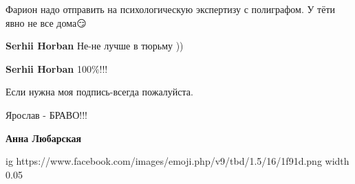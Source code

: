 \begin{itemize}
Фарион надо отправить на психологическую экспертизу с полиграфом. У тёти явно
не все дома😏

\begin{itemize}
 
\textbf{Serhii Horban} Не-не лучше в тюрьму ))

 
\textbf{Serhii Horban} 100\%!!!
\end{itemize}

 
Если нужна моя подпись-всегда пожалуйста.

 
Ярослав - БРАВО!!!

\begin{itemize}

 
\textbf{Анна Любарская} 

\ifcmt
  ig https://www.facebook.com/images/emoji.php/v9/tbd/1.5/16/1f91d.png
  width 0.05
\fi

\end{itemize}

 

\end{itemize}

